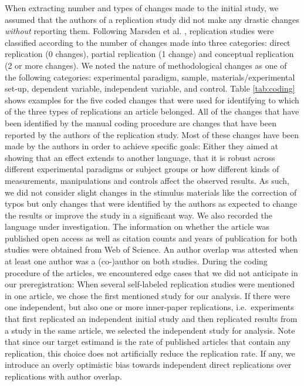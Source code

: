 \documentclass[cm,linguex]{glossa}
\begin{document}
When extracting number and types of changes made to the initial study, we assumed that the authors of a replication study did not make any drastic changes \emph{without} reporting them.
Following Marsden et al. \citeyearpar{marsden_replication_2018}, replication studies were classified according to the number of changes made into three categories: direct replication (0 changes), partial replication (1 change) and conceptual replication (2 or more changes).
We noted the nature of methodological changes as one of the following categories:
experimental paradigm, sample, materials/experimental set-up, dependent variable, independent variable, and control.
Table \ref{tab:coding} shows examples for the five coded changes that were used for identifying to which of the three types of replications an article belonged.
All of the changes that have been identified by the manual coding procedure are changes that have been reported by the authors of the replication study. Most of these changes have been made by the authors in order to achieve specific goals: Either they aimed at showing that an effect extends to another language, that it is robust across different experimental paradigms or subject groups or how different kinds of measurements, manipulations and controls affect the observed results. As such, we did not consider slight changes in the stimulus materials like the correction of typos but only changes that were identified by the authors as expected to change the results or improve the study in a significant way.
We also recorded the language under investigation.
The information on whether the article was published open access as well as citation counts and years of publication for both studies were obtained from Web of Science.
An author overlap was attested when at least one author was a (co-)author on both studies.
During the coding procedure of the articles, we encountered edge cases that we did not anticipate in our preregistration: When several self-labeled replication studies were mentioned in one article, we chose the first mentioned study for our analysis. If there were one independent, but also one or more inner-paper replications, i.e.~experiments that first replicated an independent initial study and then replicated results from a study in the same article, we selected the independent study for analysis. Note that since our target estimand is the rate of published articles that contain any replication, this choice does not artificially reduce the replication rate. If any, we introduce an overly optimistic bias towards independent direct replications over replications with author overlap.
\end{document}
